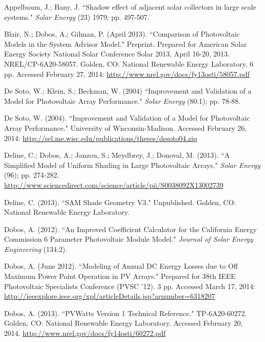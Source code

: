 \documentclass[12pt,letterpaper]{article}
\begin{document}
%
\begin{thebibliography}{99}

 Appelbaum, J.; Bany, J. ``Shadow effect of adjacent solar collectors in large scale systems." \textit{Solar Energy} (23) 1979; pp. 497-507.

 Blair, N.; Dobos, A.; Gilman, P. (April 2013). ``Comparison of Photovoltaic Models in the System Advisor Model." Preprint. Prepared for American Solar Energy Society National Solar Conference Solar 2013, April 16-20, 2013. NREL/CP-6A20-58057. Golden, CO: National Renewable Energy Laboratory, 6 pp. Accessed February 27, 2014: \url{http://www.nrel.gov/docs/fy13osti/58057.pdf}

 De Soto, W.; Klein, S.; Beckman, W. (2004) ``Improvement and Validation of a Model for Photovoltaic Array Performance." \textit{Solar Energy} (80:1); pp. 78-88.

 De Soto, W. (2004). ``Improvement and Validation of a Model for Photovoltaic Array Performance." University of Wisconsin-Madison. Accessed February 26, 2014: \url{http://sel.me.wisc.edu/publications/theses/desoto04.zip}

 Deline, C.; Dobos, A.; Janzou, S.; Meydbrey, J.; Donoval, M. (2013). ``A Simplified Model of Uniform Shading in Large Photovoltaic Arrays." \textit{Solar Energy} (96); pp. 274-282. \url{http://www.sciencedirect.com/science/article/pii/S0038092X13002739}

 Deline, C. (2013). ``SAM Shade Geometry V3." Unpublished. Golden, CO: National Renewable Energy Laboratory.

 Dobos, A. (2012). ``An Improved Coefficient Calculator for the California Energy Commission 6 Parameter Photovoltaic Module Model." \textit{Journal of Solar Energy Engineering} (134:2).

 Dobos, A. (June 2012). ``Modeling of Annual DC Energy Losses due to Off Maximum Power Point Operation in PV Arrays." Prepared for 38th IEEE Photovoltaic Specialists Conference (PVSC '12). 3 pp. Accessed March 17, 2014: \url{http://ieeexplore.ieee.org/xpl/articleDetails.jsp?arnumber=6318207}

 Dobos, A. (2013). ``PVWatts Version 1 Technical Reference." TP-6A20-60272. Golden, CO: National Renewable Energy Laboratory. Accessed February 20, 2014. \url{http://www.nrel.gov/docs/fy14osti/60272.pdf}


\end{thebibliography}
\end{document}
